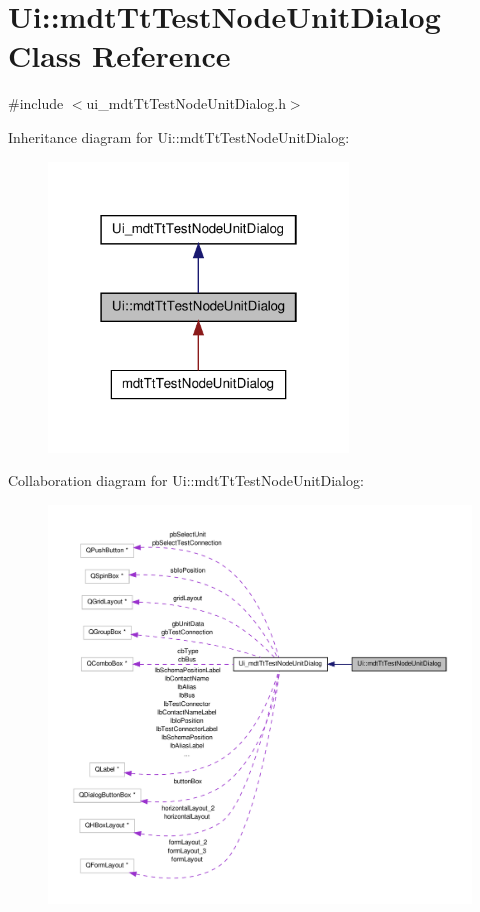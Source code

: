 \hypertarget{class_ui_1_1mdt_tt_test_node_unit_dialog}{\section{Ui\-:\-:mdt\-Tt\-Test\-Node\-Unit\-Dialog Class Reference}
\label{class_ui_1_1mdt_tt_test_node_unit_dialog}
}


{\ttfamily \#include $<$ui\-\_\-mdt\-Tt\-Test\-Node\-Unit\-Dialog.\-h$>$}



Inheritance diagram for Ui\-:\-:mdt\-Tt\-Test\-Node\-Unit\-Dialog\-:\nopagebreak
\begin{figure}[H]
\begin{center}
\leavevmode
\includegraphics[width=226pt]{class_ui_1_1mdt_tt_test_node_unit_dialog__inherit__graph}
\end{center}
\end{figure}


Collaboration diagram for Ui\-:\-:mdt\-Tt\-Test\-Node\-Unit\-Dialog\-:\nopagebreak
\begin{figure}[H]
\begin{center}
\leavevmode
\includegraphics[width=350pt]{class_ui_1_1mdt_tt_test_node_unit_dialog__coll__graph}
\end{center}
\end{figure}
